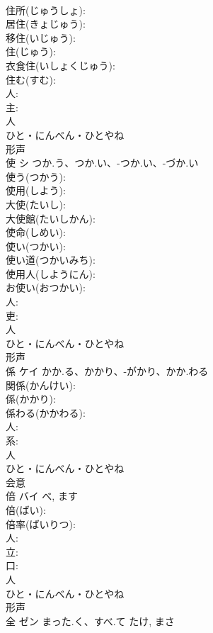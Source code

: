 \documentclass[8pt]{extreport}
\begin{document}
\begin{CJK}{UTF8}{min}
\\	住所(じゅうしょ): 
\\	居住(きょじゅう): 
\\	移住(いじゅう): 
\\	住(じゅう): 
\\	衣食住(いしょくじゅう): 
\\	住む(すむ): 
\\	人: 
\\	主: 
\\	人	
\\	ひと・にんべん・ひとやね	
\\	形声 
\\	使	シ	つか.う、つか.い、-つか.い、-づか.い		
\\	使う(つかう): 
\\	使用(しよう): 
\\	大使(たいし): 
\\	大使館(たいしかん): 
\\	使命(しめい): 
\\	使い(つかい): 
\\	使い道(つかいみち): 
\\	使用人(しようにん): 
\\	お使い(おつかい): 
\\	人: 
\\	吏: 
\\	人	
\\	ひと・にんべん・ひとやね	
\\	形声 
\\	係	ケイ	かか.る、かかり、-がかり、かか.わる		
\\	関係(かんけい): 
\\	係(かかり): 
\\	係わる(かかわる): 
\\	人: 
\\	系: 
\\	人	
\\	ひと・にんべん・ひとやね	
\\	会意 
\\	倍	バイ		べ, ます	
\\	倍(ばい): 
\\	倍率(ばいりつ): 
\\	人: 
\\	立: 
\\	口: 
\\	人	
\\	ひと・にんべん・ひとやね	
\\	形声 
\\	全	ゼン	まった.く、すべ.て	たけ, まさ	

\end{CJK}
\end{document}
